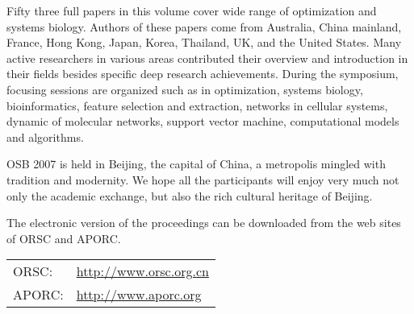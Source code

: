  \medskip

 \noindent
Fifty three full papers in this volume cover wide range of
optimization and systems biology. Authors of these papers come from
Australia, China mainland, France, Hong Kong, Japan, Korea,
Thailand, UK, and the United States. Many active researchers in
various areas contributed their overview and introduction in their
fields besides specific deep research achievements. During the
symposium, focusing sessions are organized such as in optimization,
systems biology, bioinformatics, feature selection and extraction,
networks in cellular systems, dynamic of molecular networks, support
vector machine, computational models and algorithms.

 \medskip

 \noindent
OSB 2007 is held in Beijing, the capital of China, a metropolis
mingled with tradition and modernity. We hope all the participants
will enjoy very much not only the academic exchange, but also the
rich cultural heritage of Beijing.

 \bigskip


 \medskip

 \noindent
The electronic version of the proceedings can be downloaded from the
web sites of ORSC and APORC.

 \smallskip

 \noindent
\begin{tabular}{@{}ll@{}}
 ORSC: & \url{http://www.orsc.org.cn} \\
 APORC: & \url{http://www.aporc.org}
\end{tabular}
